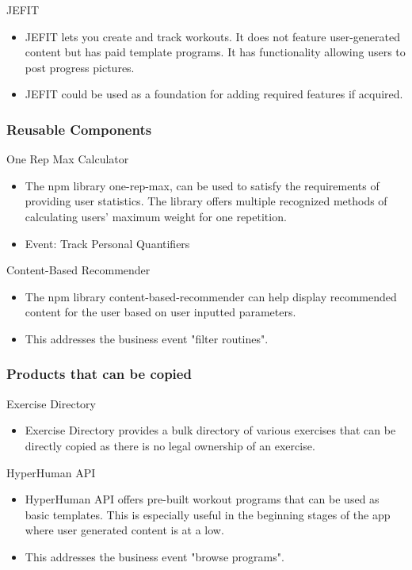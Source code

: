 \documentclass[12pt]{article}
\begin{document}
				\noindent JEFIT
				\begin{itemize}
				\item JEFIT lets you create and track workouts. It does not feature user-generated content but has paid template programs. It has functionality allowing users to post progress pictures. 
				\item JEFIT could be used as a foundation for adding required features if acquired.
				\end{itemize}
		
			\subsubsection{Reusable Components}
		
				\noindent One Rep Max Calculator
				\begin{itemize}
				\item The npm library one-rep-max, can be used to satisfy the requirements of providing user statistics. The library offers multiple recognized methods of calculating users' maximum weight for one repetition. 
				\item Event: Track Personal Quantifiers 
				\end{itemize}
				
				\noindent Content-Based Recommender 
				\begin{itemize}
				\item The npm library content-based-recommender can help display recommended content for the user based on user inputted parameters.
				\item This addresses the business event "filter routines". 
				\end{itemize}
		
			\subsubsection{Products that can be copied}
		
				\noindent Exercise Directory
				\begin{itemize}
				\item Exercise Directory provides a bulk directory of various exercises that can be directly copied as there is no legal ownership of an exercise.
				\end{itemize}
		
				\noindent HyperHuman API 
				\begin{itemize}
				\item HyperHuman API offers pre-built workout programs that can be used as basic templates. This is especially useful in the beginning stages of the app where user generated content is at a low. 
				\item This addresses the business event "browse programs". 
				\end{itemize}
		
\end{document}
